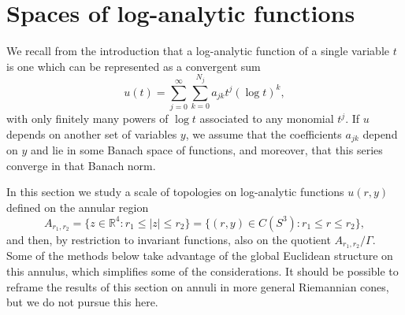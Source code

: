 \documentclass[12pt]{article}
\newcommand{\RR}{\mathbb R}
\begin{document}
\section{Spaces of log-analytic functions}
We recall from the introduction that a log-analytic function of a single variable $t$ is one which
can be represented as a convergent sum
\[
u(t) = \sum_{j=0}^\infty \sum_{k=0}^{N_j} a_{jk} t^j (\log t)^k,
\]
with only finitely many powers of $\log t$ associated to any monomial $t^j$.  If $u$ depends on another set of variables $y$, 
we assume that the coefficients $a_{jk}$ depend on $y$ and lie in some Banach space of functions, and moreover, that
this series converge in that Banach norm. 

In this section we study a scale of topologies on log-analytic functions $u(r,y)$ defined on the annular region
\[
A_{r_1, r_2} = \{z \in \RR^4: r_1 \leq |z| \leq r_2\} = \{ (r,y) \in C(S^3):  r_1 \leq r \leq r_2 \},
\]
and then, by restriction to invariant functions, also on the quotient $A_{r_1, r_2}/\Gamma$. 
Some of the methods below take advantage of the global Euclidean structure on this annulus, which simplifies
some of the considerations. It should be possible to reframe the results of this section on annuli
in more general Riemannian cones, but we do not pursue this here. 
\end{document}
